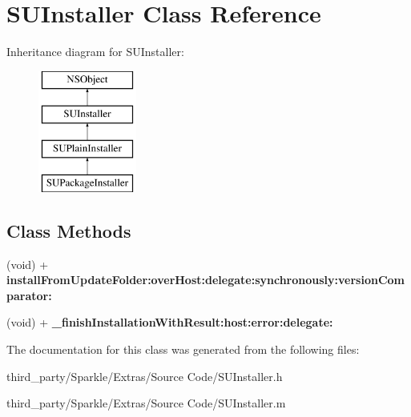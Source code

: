 \hypertarget{interface_s_u_installer}{}\section{S\+U\+Installer Class Reference}
\label{interface_s_u_installer}
Inheritance diagram for S\+U\+Installer\+:\begin{figure}[H]
\begin{center}
\leavevmode
\includegraphics[height=4.000000cm]{interface_s_u_installer}
\end{center}
\end{figure}
\subsection*{Class Methods}
\begin{DoxyCompactItemize}
\item 
\mbox{\label{interface_s_u_installer_acb7758e2e65e9fa433350fb459c53619}} 
(void) + {\bfseries install\+From\+Update\+Folder\+:over\+Host\+:delegate\+:synchronously\+:version\+Comparator\+:}
\item 
\mbox{\label{interface_s_u_installer_a0a3e179bf6b840b808384fe8692ecb35}} 
(void) + {\bfseries \+\_\+finish\+Installation\+With\+Result\+:host\+:error\+:delegate\+:}
\end{DoxyCompactItemize}


The documentation for this class was generated from the following files\+:\begin{DoxyCompactItemize}
\item 
third\+\_\+party/\+Sparkle/\+Extras/\+Source Code/S\+U\+Installer.\+h\item 
third\+\_\+party/\+Sparkle/\+Extras/\+Source Code/S\+U\+Installer.\+m\end{DoxyCompactItemize}
